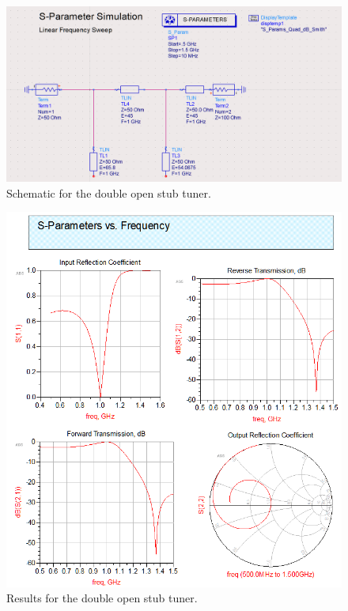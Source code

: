 \begin{figure}[h]
    \centering
    \includegraphics[width=0.8\linewidth]{res/ADS/DoubleOpenStubSchematic.png}
    \caption{Schematic for the double open stub tuner.}
    \label{fig:}
\end{figure}
\begin{figure}[h]
    \centering
    \includegraphics[width=0.8\linewidth]{res/ADS/DoubleOpenStub.png}
    \caption{Results for the double open stub tuner.}
    \label{fig:}
\end{figure}
